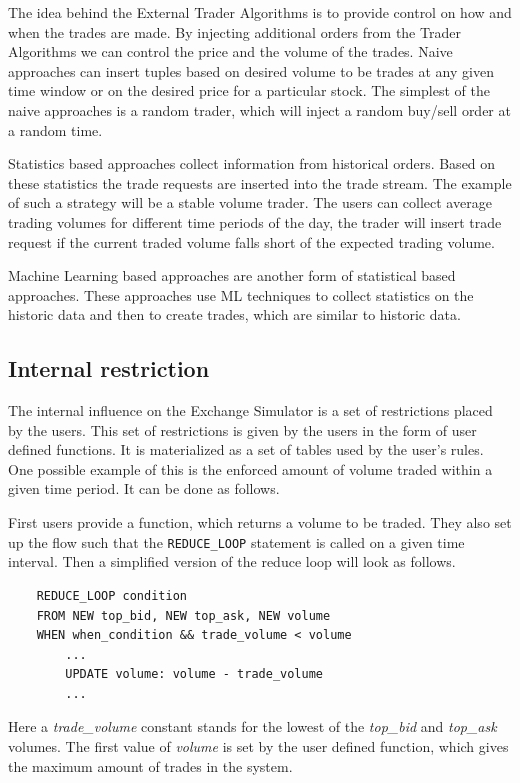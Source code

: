 \documentclass{article}
\begin{document}
The idea behind the External Trader Algorithms is to provide control on how and when the trades are made. By injecting additional orders from the Trader Algorithms we can control the price and the volume of the trades. Naive approaches can insert tuples based on desired volume to be trades at any given time window or on the desired price for a particular stock. The simplest of the naive approaches is a random trader, which will inject a random buy/sell order at a random time.  

Statistics based approaches collect information from historical orders. Based on these statistics the trade requests are inserted into the trade stream. The example of such a strategy will be a stable volume trader. The users can collect average trading volumes for different time periods of the day, the trader will insert trade request if the current traded volume falls short of the expected trading volume.

Machine Learning based approaches are another form of statistical based approaches. These approaches use ML techniques to collect statistics on the historic data and then to create trades, which are similar to historic data. 

\subsection{Internal restriction}

The internal influence on the Exchange Simulator is a set of restrictions placed by the users. This set of restrictions is given by the users in the form of user defined functions. It is materialized as a set of tables used by the user's rules. One possible example of this is the enforced amount of volume traded within a given time period. It can be done as follows. 

First users provide a function, which returns a volume to be traded. They also set up the flow such that the {\tt REDUCE\_LOOP} statement is called on a given time interval. Then a simplified version of the reduce loop will look as follows.

\begin{verbatim}
    REDUCE_LOOP condition
    FROM NEW top_bid, NEW top_ask, NEW volume
    WHEN when_condition && trade_volume < volume
        ...
        UPDATE volume: volume - trade_volume
        ...
\end{verbatim}

Here a \emph{trade\_volume} constant stands for the lowest of the \emph{top\_bid} and \emph{top\_ask} volumes. The first value of \emph{volume} is set by the user defined function, which gives the maximum amount of trades in the system.
\end{document}
